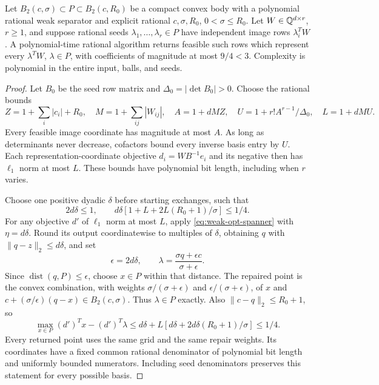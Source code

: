 \begin{lemma}\label{lem:rational-spanner}
Let $B_2(c,\sigma)\subset P\subset B_2(c,R_0)$ be a compact convex
body with a polynomial rational weak separator and explicit rational
$c,\sigma,R_0$, $0<\sigma\le R_0$. Let $W\in\mathbb Q^{d\times r}$,
$r\ge1$, and suppose rational seeds $\lambda_1,\ldots,\lambda_r\in P$
have independent image rows $\lambda_i^TW$. A polynomial-time rational
algorithm returns feasible such rows which represent every
$\lambda^TW$, $\lambda\in P$, with coefficients of magnitude at most
$9/4<3$. Complexity is polynomial in the entire input, balls, and seeds.
\end{lemma}
\begin{proof}
Let $B_0$ be the seed row matrix and $\Delta_0=|\det B_0|>0$.
Choose the rational bounds
\[
 Z=1+\sum_i|c_i|+R_0,\quad M=1+\sum_{ij}|W_{ij}|,\quad
 A=1+dMZ,\quad U=1+r!A^{r-1}/\Delta_0,\quad L=1+dMU.
\]
Every feasible image coordinate has magnitude at most $A$.
As long as determinants never decrease, cofactors bound every inverse
basis entry by $U$. Each representation-coordinate objective
$d_i=WB^{-1}e_i$ and its negative then has $\ell_1$ norm at most $L$.
These bounds have polynomial bit length, including when $r$ varies.

Choose one positive dyadic $\delta$ before starting exchanges, such that
\begin{equation}\label{eq:fixed-spanner-grid}
 2d\delta\le1,\qquad
 d\delta[1+L+2L(R_0+1)/\sigma]\le1/4.
\end{equation}
For any objective $d'$ of $\ell_1$ norm at most $L$, apply
\eqref{eq:weak-opt-spanner} with $\eta=d\delta$. Round its output
coordinatewise to multiples of $\delta$, obtaining $q$ with
$\|q-z\|_2\le d\delta$, and set
\begin{equation}\label{eq:spanner-repair}
 \epsilon=2d\delta,\qquad
 \lambda=\frac{\sigma q+\epsilon c}{\sigma+\epsilon}.
\end{equation}
Since $\operatorname{dist}(q,P)\le\epsilon$, choose $x\in P$ within
that distance. The repaired point is the convex combination, with
weights $\sigma/(\sigma+\epsilon)$ and
$\epsilon/(\sigma+\epsilon)$, of $x$ and
$c+(\sigma/\epsilon)(q-x)\in B_2(c,\sigma)$.
Thus $\lambda\in P$ exactly. Also $\|c-q\|_2\le R_0+1$, so
\[
 \max_{x\in P}(d')^Tx-(d')^T\lambda
 \le d\delta+L[d\delta+2d\delta(R_0+1)/\sigma]\le1/4.
\]
Every returned point uses the same grid and the same repair weights.
Its coordinates have a fixed common rational denominator of polynomial
bit length and uniformly bounded numerators. Including seed denominators
preserves this statement for every possible basis.


\end{proof}

